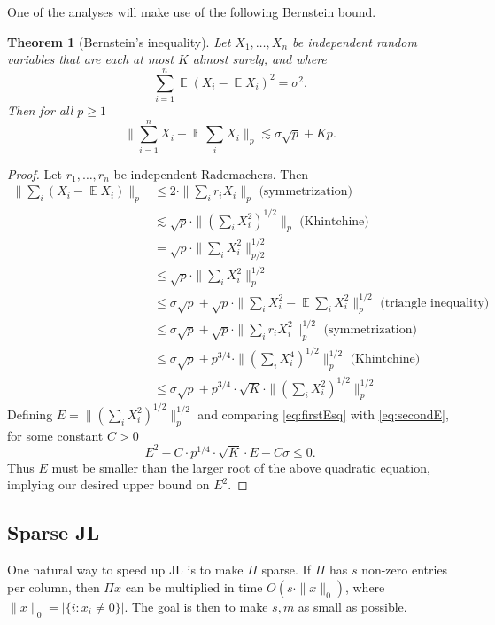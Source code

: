 \documentclass[12pt]{article}
\DeclareMathOperator*{\E}{\mathbb{E}}
\newtheorem{theorem}{Theorem}
\newcommand{\EquationName}[1]{\label{eq:#1}}
\newcommand{\TheoremName}[1]{\label{thm:#1}}
\newcommand{\Eqsub}[1]{\eqref{eq:#1}}
\begin{document}
One of the analyses will make use of the following Bernstein bound.

\begin{theorem}[Bernstein's inequality]\TheoremName{bernstein}
Let $X_1,\ldots,X_n$ be independent random variables that are each at most $K$ almost surely, and where
$$
\sum_{i=1}^n \E(X_i - \E X_i)^2 = \sigma^2 .
$$
Then for all $p\ge 1$
$$
\|\sum_{i=1}^n X_i - \E\sum_i X_i\|_p \lesssim \sigma\sqrt{p} + Kp .
$$
\end{theorem}
\begin{proof}
Let $r_1,\ldots,r_n$ be independent Rademachers. Then
\begin{align}
\nonumber \|\sum_i (X_i - \E X_i)\|_p  &\le 2\cdot \|\sum_i r_i X_i\|_p \text{ (symmetrization)}\\
{}& \lesssim \sqrt{p}\cdot\|(\sum_i X_i^2)^{1/2}\|_p\text{ (Khintchine)} \EquationName{firstEsq}\\
\nonumber {}& = \sqrt{p} \cdot\|\sum_i X_i^2\|_{p/2}^{1/2}\\
\nonumber {}& \le \sqrt{p} \cdot\|\sum_i X_i^2\|_p^{1/2}\\
\nonumber {}& \le \sigma\sqrt{p} + \sqrt{p}\cdot \|\sum_i X_i^2 - \E \sum_i X_i^2\|_p^{1/2} \text{ (triangle inequality)}\\
\nonumber {}& \le \sigma\sqrt{p} + \sqrt{p}\cdot \|\sum_i r_i X_i^2\|_p^{1/2}\text{ (symmetrization)}\\
\nonumber {}& \le \sigma\sqrt{p} + p^{3/4} \cdot \|(\sum_i X_i^4)^{1/2}\|_p^{1/2} \text{ (Khintchine)}\\
{}& \le \sigma\sqrt{p} + p^{3/4} \cdot \sqrt{K} \cdot \|(\sum_i X_i^2)^{1/2}\|_p^{1/2} \EquationName{secondE}
\end{align}
Defining $E = \|(\sum_i X_i^2)^{1/2}\|_p^{1/2}$ and comparing \Eqsub{firstEsq} with \Eqsub{secondE}, for some constant $C>0$ 
$$
E^2 - C\cdot p^{1/4} \cdot \sqrt{K} \cdot E - C\sigma \le 0 .
$$
Thus $E$ must be smaller than the larger root of the above quadratic equation, implying our desired upper bound on $E^2$.
\end{proof} 

\subsection{Sparse JL}

One natural way to speed up JL is to make $\Pi$ sparse. If $\Pi$ has $s$ non-zero entries per column, then $\Pi x$ can be multiplied in time $O(s\cdot\|x\|_0)$, where $\|x\|_0 = |\{i : x_i \neq 0\}|$. The goal is then to make $s, m$ as small as possible.
\end{document}
